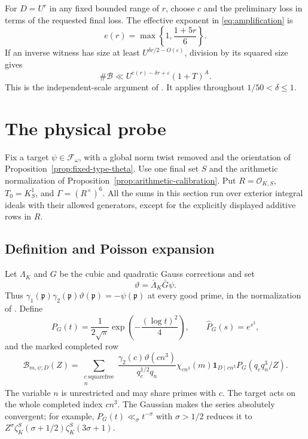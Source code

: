 \documentclass[11pt,a4paper]{article}
\numberwithin{equation}{section}
\theoremstyle{definition}
\theoremstyle{remark}
\newcommand{\eps}{\varepsilon}
\newcommand{\cF}{\mathcal F}
\newcommand{\cB}{\mathcal B}
\newcommand{\ind}{\mathbf 1}
\begin{document}
For $D=U^r$ in any fixed bounded range of $r$, choose $c$ and the
preliminary loss in terms of the requested final loss.  The effective
exponent in \eqref{eq:amplification} is
\begin{equation}\label{eq:e-r}
 e(r)=\max\left\{1,\frac{1+5r}{6}\right\}.
\end{equation}
If an inverse witness has size at least $U^{\delta r/2-O(\eps)}$,
division by its squared size gives
\begin{equation}\label{eq:unmarked-count}
 \#\cB\ll U^{e(r)-\delta r+\eps}(1+T)^A.
\end{equation}
This is the independent-scale argument of \cite[Lemma~17.6, equation~(19.3), and Remark~19.3]{Q}.  It applies throughout $1/50<\delta\leq1$.

\section{The physical probe}\label{sec:physical}

Fix a target $\psi\in\cF_\omega$, with a global norm twist removed and
the orientation of Proposition~\ref{prop:fixed-type-theta}.  Use one final
set $S$ and the arithmetic normalization of
Proposition~\ref{prop:arithmetic-calibration}.  Put
$R=\mathcal O_{K,S}$, $T_0=K_S^1$, and $\Gamma=(R^\times)^6$.
All the sums in this section run over exterior integral ideals with their
allowed generators, except for the explicitly displayed additive rows in $R$.

\subsection{Definition and Poisson expansion}

Let $\Lambda_K$ and $G$ be the cubic and quadratic Gauss corrections and set
\[
 \vartheta=\bar\Lambda_K\bar G\psi.
\]
Thus $\gamma_1(\mathfrak p)\gamma_2(\mathfrak p)
\vartheta(\mathfrak p)=-\psi(\mathfrak p)$ at every good prime, in the
normalization of \cite[Lemma~3.4]{P}.  Define
\[
 P_G(t)=\frac1{2\sqrt\pi}\exp\!\left(-\frac{(\log t)^2}{4}\right),
 \qquad \widehat P_G(s)=e^{s^2},
\]
and the marked completed row
\begin{equation}\label{eq:physical-B}
 \mathcal B_{m,\psi;D}(Z)
  =\sum_{\substack{c\ \mathrm{squarefree}\\n}}
    \frac{\gamma_2(c)\vartheta(cn^3)}{q_c^{1/2}q_n}
       \chi_{cn^3}(m)\ind_{D\mid cn^3}
       P_G(q_cq_n^3/Z).
\end{equation}
The variable $n$ is unrestricted and may share primes with $c$.
The target acts on the whole completed index $cn^3$.
The Gaussian makes the series absolutely convergent; for example,
$P_G(t)\ll_\sigma t^{-\sigma}$ with $\sigma>1/2$ reduces it to
$Z^\sigma\zeta_K^S(\sigma+1/2)\zeta_K^S(3\sigma+1)$.
\end{document}
